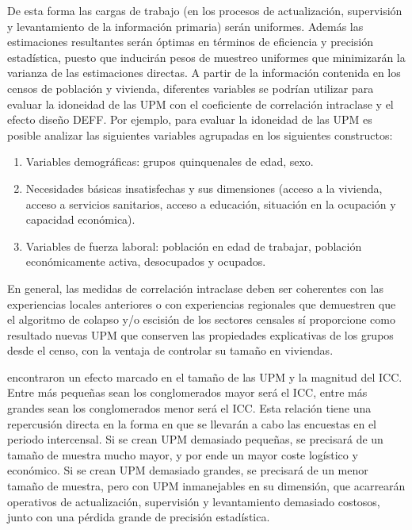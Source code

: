 \documentclass[
  10pt,
  spanish,
]{book}
\providecommand{\tightlist}{%
  \setlength{\itemsep}{0pt}\setlength{\parskip}{0pt}}
\begin{document}
De esta forma las cargas de trabajo (en los procesos de actualización, supervisión y levantamiento de la información primaria) serán uniformes. Además las estimaciones resultantes serán óptimas en términos de eficiencia y precisión estadística, puesto que inducirán pesos de muestreo uniformes que minimizarán la varianza de las estimaciones directas. A partir de la información contenida en los censos de población y vivienda, diferentes variables se podrían utilizar para evaluar la idoneidad de las UPM con el coeficiente de correlación intraclase y el efecto diseño DEFF. Por ejemplo, para evaluar la idoneidad de las UPM es posible analizar las siguientes variables agrupadas en los siguientes constructos:

\begin{enumerate}
\def\labelenumi{\arabic{enumi}.}
\tightlist
\item
  Variables demográficas: grupos quinquenales de edad, sexo.
\item
  Necesidades básicas insatisfechas y sus dimensiones (acceso a la vivienda, acceso a servicios sanitarios, acceso a educación, situación en la ocupación y capacidad económica).
\item
  Variables de fuerza laboral: población en edad de trabajar, población económicamente activa, desocupados y ocupados.
\end{enumerate}

En general, las medidas de correlación intraclase deben ser coherentes con las experiencias locales anteriores o con experiencias regionales que demuestren que el algoritmo de colapso y/o escisión de los sectores censales sí proporcione como resultado nuevas UPM que conserven las propiedades explicativas de los grupos desde el censo, con la ventaja de controlar su tamaño en viviendas.

\citet{hansen1953sample} encontraron un efecto marcado en el tamaño de las UPM y la magnitud del ICC. Entre más pequeñas sean los conglomerados mayor será el ICC, entre más grandes sean los conglomerados menor será el ICC. Esta relación tiene una repercusión directa en la forma en que se llevarán a cabo las encuestas en el periodo intercensal. Si se crean UPM demasiado pequeñas, se precisará de un tamaño de muestra mucho mayor, y por ende un mayor coste logístico y económico. Si se crean UPM demasiado grandes, se precisará de un menor tamaño de muestra, pero con UPM inmanejables en su dimensión, que acarrearán operativos de actualización, supervisión y levantamiento demasiado costosos, junto con una pérdida grande de precisión estadística.
\end{document}
